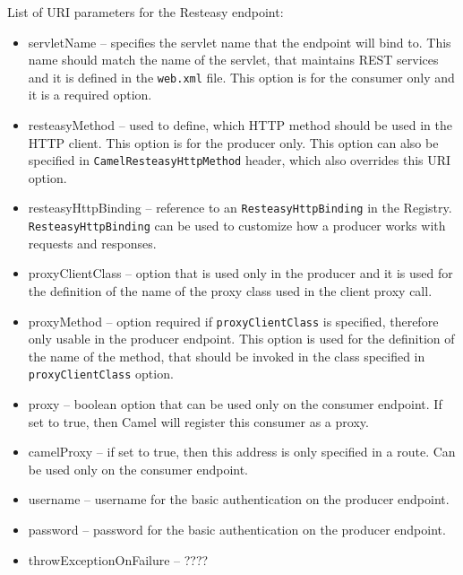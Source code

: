 \documentclass[12pt,final,oneside]{fithesis2}
\begin{document}
List of URI parameters for the Resteasy endpoint:
\begin{itemize}
\item
servletName -- specifies the servlet name that the endpoint will bind to. This name should match the name of the servlet, that maintains REST services and it is defined in the \texttt{web.xml} file. This option is for the consumer only and it is a required option. 

\item
resteasyMethod -- used to define, which HTTP method should be used in the HTTP client. This option is for the producer only. This option can also be specified in \texttt{CamelResteasyHttpMethod} header, which also overrides  this URI option.

\item
resteasyHttpBinding --  reference to an \texttt{ResteasyHttpBinding} in the Registry. \texttt{ResteasyHttpBinding} can be used to customize how a producer works with requests and responses.

\item
proxyClientClass -- option that is used only in the producer and it is used for the definition of the name of the proxy class used in the client proxy call.

\item    
proxyMethod -- option required if \texttt{proxyClientClass} is specified, therefore only usable in the producer endpoint. This option is used for the definition of the name of the method, that should be invoked in the class specified in \texttt{proxyClientClass} option.

\item
proxy -- boolean option that can be used only on the consumer endpoint. If set to true, then Camel will register this consumer as a proxy. 

\item 
camelProxy -- if set to true, then this address is only specified in a route. Can be used only on the consumer endpoint.

\item
username -- username for the basic authentication on the producer endpoint.

\item
password -- password for the basic authentication on the producer endpoint.

\item
throwExceptionOnFailure -- ????
\end{itemize}
\end{document}
